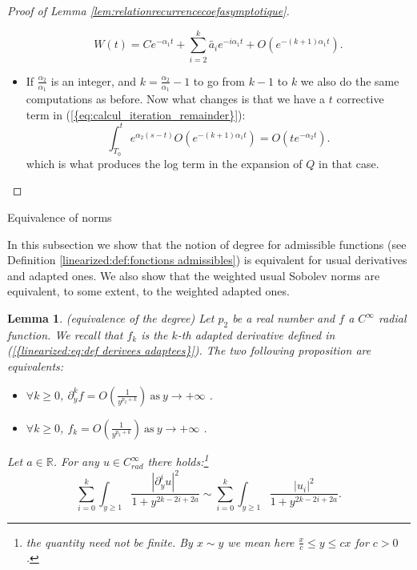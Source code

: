 \documentclass[11pt,a4paper,reqno]{amsart}
\newtheorem{lemma}[theorem]{Lemma}
\theoremstyle{remark}
\numberwithin{equation}{section}
\begin{document}
\begin{appendix}
\begin{proof}[Proof of Lemma \ref{lem:relationrecurrencecoefasymptotique}]
\begin{itemize}
$$
W(t)=Ce^{-\alpha_1 t}+\sum_{i=2}^{k} \tilde{a_i} e^{-i\alpha_1 t}+O(e^{-(k+1)\alpha_1 t} ).
$$
\item[(ii)] If $\frac{\alpha_2}{\alpha_1}$ is an integer, and $k=\frac{\alpha_2}{\alpha_1}-1$ to go from $k-1$ to $k$ we also do the same computations as before. Now what changes is that we have a $t$ corrective term in {{\rm (\ref{{eq:calcul_iteration_remainder}})}}:
$$
\int_{T_0}^t e^{\alpha_2(s-t)}O(e^{-(k+1)\alpha_1 t})=O(te^{-\alpha_2 t}) .
$$
which is what produces the log term in the expansion of $Q$ in that case.
\end{itemize}

\end{proof}

{  \z@{1.5\linespacing\@plus\linespacing}{.5\linespacing}  {\normalfont\bfseries\large\centering}}{Equivalence of norms}

In this subsection we show that the notion of degree for admissible functions (see Definition \ref{linearized:def:fonctions admissibles}) is equivalent for usual derivatives and adapted ones. We also show that the weighted usual Sobolev norms are equivalent, to some extent, to the weighted adapted ones.

\begin{lemma}\label{annexe:lem:equivalence degre}\emph{(equivalence of the degree)}
Let $p_2$ be a real number and $f$ a $C^{\infty}$ radial function. We recall that $f_k$ is the $k$-th adapted derivative defined in {{\rm (\ref{{linearized:eq:def derivees adaptees}})}}. The two following proposition are equivalents:
\begin{itemize}
\item[(i)] $\forall k\geq 0$, $\partial_y^k f=O\left( \frac{1}{y^{p_2+k}}\right) \ \text{as} \ y \rightarrow +\infty$ .
\item[(ii)] $\forall k\geq 0$, $f_k=O\left( \frac{1}{y^{p_2+k}}\right) \ \text{as} \ y\rightarrow +\infty$ .
\end{itemize} 
Let $a\in \mathbb{R}$. For any $u\in C^{\infty}_{rad}$ there holds:\footnote{the quantity need not be finite. By $x\sim y$ we mean here $\frac{x}{c}\leq y \leq c x $ for $c>0$.}
\begin{equation} \label{annexe:eq:equivalence derivees adaptees et usuelles hors origine}
\sum_{i=0}^k \int_{y\geq 1} \frac{|\partial_y^i u|^2}{1+y^{2k-2i+2a}}\sim \sum_{i=0}^k \int_{y\geq 1} \frac{|u_i|^2}{1+y^{2k-2i+2a}} .
\end{equation}


\end{lemma}
\end{appendix}
\end{document}
